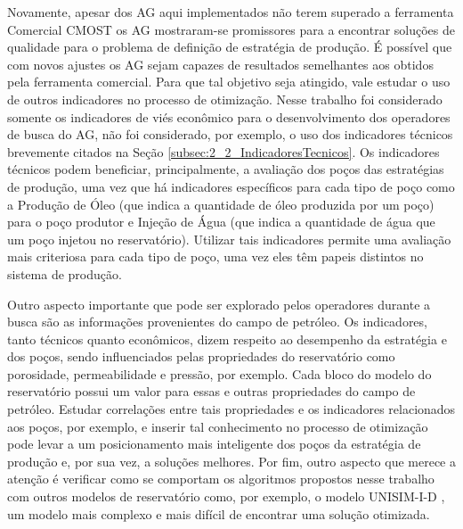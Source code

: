 Novamente, apesar dos AG aqui implementados não terem superado a ferramenta Comercial CMOST os AG mostraram-se promissores para a encontrar soluções de qualidade para o problema de definição de estratégia de produção. É possível que com novos ajustes os AG sejam capazes de resultados semelhantes aos obtidos pela ferramenta comercial.  Para que tal objetivo seja atingido, vale estudar o uso de outros indicadores no processo de otimização. Nesse trabalho foi considerado somente os indicadores de viés econômico para o desenvolvimento dos operadores de busca do AG, não foi considerado, por exemplo, o uso dos indicadores técnicos brevemente citados na Seção \ref{subsec:2_2_IndicadoresTecnicos}. Os indicadores técnicos podem beneficiar, principalmente, a avaliação dos poços das estratégias de produção, uma vez que há indicadores específicos para cada tipo de poço como a Produção de Óleo (que indica a quantidade de óleo produzida por um poço) para o poço produtor e Injeção de Água (que indica a quantidade de água que um poço injetou no reservatório). Utilizar tais indicadores permite uma avaliação mais criteriosa para cada tipo de poço, uma vez eles têm papeis distintos no sistema de produção. 

Outro aspecto importante que pode ser explorado pelos operadores durante a busca são as informações provenientes do campo de petróleo. Os indicadores, tanto técnicos quanto econômicos, dizem respeito ao desempenho da estratégia e dos poços, sendo influenciados pelas propriedades do reservatório como porosidade, permeabilidade e pressão, por exemplo. Cada bloco do modelo do reservatório possui um valor para essas e outras propriedades do campo de petróleo. Estudar correlações entre tais propriedades e os indicadores relacionados aos poços, por exemplo, e inserir tal conhecimento no processo de otimização pode levar a um posicionamento mais inteligente dos poços da estratégia de produção e, por sua vez, a soluções melhores. Por fim, outro aspecto que merece a atenção é verificar como se comportam os algoritmos propostos nesse trabalho com outros modelos de reservatório como, por exemplo, o modelo UNISIM-I-D \cite{GasparRavagnani2015}, um modelo mais complexo e mais difícil de encontrar uma solução otimizada.
